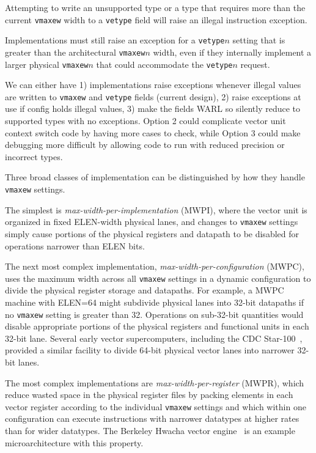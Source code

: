 Attempting to write an unsupported type or a type that requires more
than the current {\tt vmaxew} width to a {\tt vetype} field will raise
an illegal instruction exception.

\begin{commentary}
Implementations must still raise an exception for a {\tt vetype}$n$
setting that is greater than the architectural {\tt vmaxew}$n$ width,
even if they internally implement a larger physical {\tt vmaxew}$n$
that could accommodate the {\tt vetype}$n$ request.
\end{commentary}

\begin{discussion}
We can either have 1) implementations raise exceptions whenever
illegal values are written to {\tt vmaxew} and {\tt vetype} fields
(current design), 2) raise exceptions at use if config holds illegal
values, 3) make the fields WARL so silently reduce to supported types
with no exceptions.  Option 2 could complicate vector unit context
switch code by having more cases to check, while Option 3 could make
debugging more difficult by allowing code to run with reduced
precision or incorrect types.
\end{discussion}

\begin{commentary}
Three broad classes of implementation can be distinguished by how they
handle {\tt vmaxew} settings.

The simplest is {\em max-width-per-implementation} (MWPI), where the
vector unit is organized in fixed ELEN-width physical lanes, and
changes to {\tt vmaxew} settings simply cause portions of the
physical registers and datapath to be disabled for operations narrower
than ELEN bits.

The next most complex implementation, {\em
  max-width-per-configuration} (MWPC), uses the maximum width across
all {\tt vmaxew} settings in a dynamic configuration to divide the
physical register storage and datapaths.  For example, a MWPC machine
with ELEN=64 might subdivide physical lanes into 32-bit datapaths if
no {\tt vmaxew} setting is greater than 32.  Operations on
sub-32-bit quantities would disable appropriate portions of the
physical registers and functional units in each 32-bit lane.  Several
early vector supercomputers, including the CDC
Star-100~\cite{cdcstart100}, provided a similar facility to divide
64-bit physical vector lanes into narrower 32-bit lanes.

The most complex implementations are {\em max-width-per-register}
(MWPR), which reduce wasted space in the physical register files by
packing elements in each vector register according to the individual
{\tt vmaxew} settings and which within one configuration can
execute instructions with narrower datatypes at higher rates than for
wider datatypes.  The Berkeley Hwacha vector
engine~\cite{hwachatr,mixedprecision} is an example microarchitecture
with this property.
\end{commentary}

